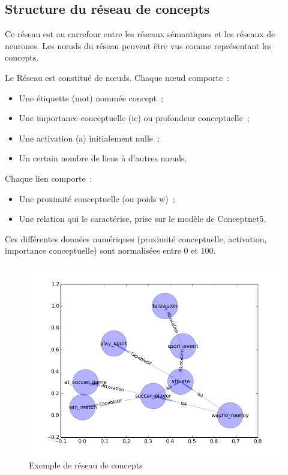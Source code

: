 \documentclass[a4paper, 12pt]{article}
\begin{document}
\subsection{Structure du réseau de concepts}

\begin{definition}
Ce réseau est au carrefour entre les réseaux sémantiques et les réseaux de neurones. Les nœuds du réseau peuvent être vus comme représentant les concepts.
\end{definition}

Le Réseau est constitué de n\oe{}uds. Chaque n\oe{}ud comporte~:
\begin{itemize}
  \item Une étiquette (mot) nommée concept~;
 \item Une importance conceptuelle (ic) ou profondeur conceptuelle~;
 \item Une activation (a) initialement nulle~;
 \item Un certain nombre de liens à d'autres n\oe{}uds.
\end{itemize}

Chaque lien comporte~:
\begin{itemize}
 \item Une proximité conceptuelle (ou poids w)~;
 \item Une relation qui le caractérise, prise sur le modèle de Conceptnet5.
\end{itemize}

Ces différentes données numériques (proximité conceptuelle, activation, importance conceptuelle) sont normalisées entre $0$ et $100$.

\begin{figure}[h]
 \centering
 \includegraphics[width=14cm]{./rc_exemple.png}
 \caption{\label{fig:rc_exemple}Exemple de réseau de concepts}
\end{figure}
\end{document}
